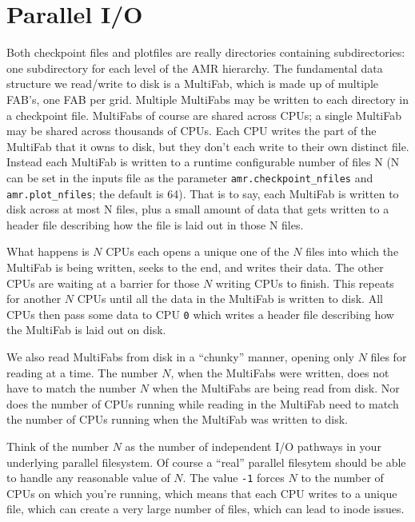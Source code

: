 \section{Parallel I/O}

Both checkpoint files and plotfiles are really directories containing
subdirectories: one subdirectory for each level of the AMR hierarchy.
The fundamental data structure we read/write to disk is a MultiFab,
which is made up of multiple FAB's, one FAB per grid.  Multiple
MultiFabs may be written to each directory in a checkpoint file.
MultiFabs of course are shared across CPUs; a single MultiFab may be
shared across thousands of CPUs.  Each CPU writes the part of the
MultiFab that it owns to disk, but they don't each write to their own
distinct file.  Instead each MultiFab is written to a runtime
configurable number of files N (N can be set in the inputs file as the
parameter {\tt amr.checkpoint\_nfiles} and {\tt amr.plot\_nfiles}; the
default is 64).  That is to say, each MultiFab is written to disk
across at most N files, plus a small amount of data that gets written
to a header file describing how the file is laid out in those N files.

What happens is $N$ CPUs each opens a unique one of the $N$ files into
which the MultiFab is being written, seeks to the end, and writes
their data.  The other CPUs are waiting at a barrier for those $N$
writing CPUs to finish.  This repeats for another $N$ CPUs until all the
data in the MultiFab is written to disk.  All CPUs then pass some data
to CPU {\tt 0} which writes a header file describing how the MultiFab is
laid out on disk.

We also read MultiFabs from disk in a ``chunky'' manner, opening only $N$
files for reading at a time.  The number $N$, when the MultiFabs were
written, does not have to match the number $N$ when the MultiFabs are
being read from disk.  Nor does the number of CPUs running while
reading in the MultiFab need to match the number of CPUs running when
the MultiFab was written to disk.

Think of the number $N$ as the number of independent I/O pathways in
your underlying parallel filesystem.  Of course a ``real'' parallel
filesytem should be able to handle any reasonable value of $N$.  The
value {\tt -1} forces $N$ to the number of CPUs on which you're
running, which means that each CPU writes to a unique file, which can
create a very large number of files, which can lead to inode issues.


